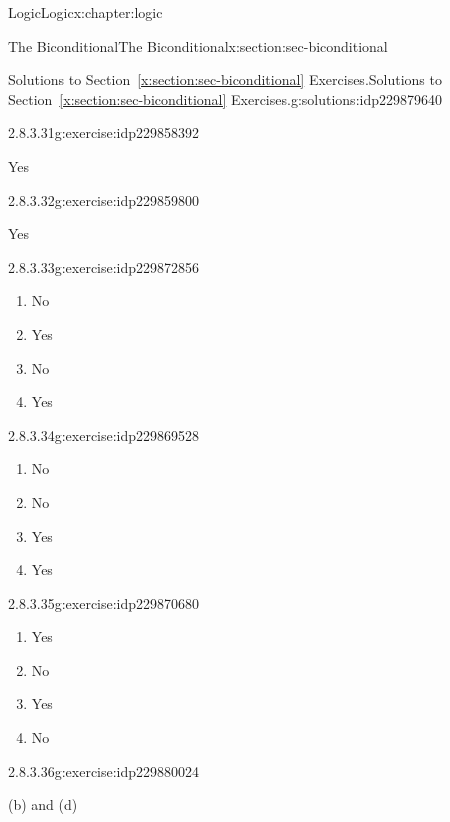 \documentclass[twoside,10pt,]{book}
\newcommand{\xreffont}{\relax}
\numberwithin{equation}{section}
\begin{document}
\begin{chapterptx}{Logic}{}{Logic}{}{}{x:chapter:logic}
\begin{sectionptx}{The Biconditional}{}{The Biconditional}{}{}{x:section:sec-biconditional}
\begin{solutions-subsection}{Solutions to Section~{\xreffont\ref*{x:section:sec-biconditional}} Exercises.}{}{Solutions to Section~{\xreffont\ref*{x:section:sec-biconditional}} Exercises.}{}{}{g:solutions:idp229879640}
\begin{exercisegroup}
\begin{divisionsolutioneg}{2.8.3.31}{}{g:exercise:idp229858392}
\par\smallskip%
\noindent\hypertarget{g:solution:idp229865560-main}{}Yes\end{divisionsolutioneg}%
\begin{divisionsolutioneg}{2.8.3.32}{}{g:exercise:idp229859800}%
\par\smallskip%
\noindent\hypertarget{g:solution:idp229866456-main}{}Yes\end{divisionsolutioneg}%
\end{exercisegroup}
\par\medskip\noindent
\begin{divisionsolution}{2.8.3.33}{}{g:exercise:idp229872856}%
\par\smallskip%
\noindent\hypertarget{g:solution:idp229869272-main}{}%
\begin{enumerate}[label=(\alph*)]
\item{}No%
\item{}Yes%
\item{}No%
\item{}Yes%
\end{enumerate}
\end{divisionsolution}%
\begin{divisionsolution}{2.8.3.34}{}{g:exercise:idp229869528}%
\par\smallskip%
\noindent\hypertarget{g:solution:idp229867480-main}{}%
\begin{enumerate}[label=(\alph*)]
\item{}No%
\item{}No%
\item{}Yes%
\item{}Yes%
\end{enumerate}
\end{divisionsolution}%
\begin{divisionsolution}{2.8.3.35}{}{g:exercise:idp229870680}%
\par\smallskip%
\noindent\hypertarget{g:solution:idp229871704-main}{}%
\begin{enumerate}[label=(\alph*)]
\item{}Yes%
\item{}No%
\item{}Yes%
\item{}No%
\end{enumerate}
\end{divisionsolution}%
\begin{divisionsolution}{2.8.3.36}{}{g:exercise:idp229880024}%
\par\smallskip%
\noindent\hypertarget{g:solution:idp229875544-main}{}(b) and (d)\end{divisionsolution}%
\end{solutions-subsection}
\end{sectionptx}
\end{chapterptx}
\end{document}
